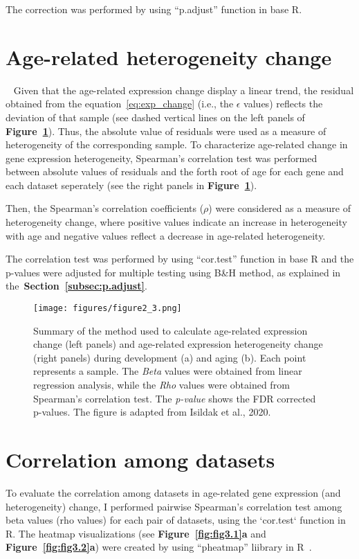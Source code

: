 The correction was performed by using ``p.adjust'' function in base R.

\section{Age-related heterogeneity change}~\label{sec:het-change}
Given that the age-related expression change display a linear trend, the residual obtained from the equation~\ref{eq:exp_change} (i.e., the $\epsilon$ values)
reflects the deviation of that sample (see dashed vertical lines on the left panels of \textbf{Figure~\ref{fig:fig2.3}}).
Thus, the absolute value of residuals were used as a measure of heterogeneity of the corresponding sample. 
To characterize age-related change in gene expression heterogeneity,
Spearman's correlation test was performed between absolute values of residuals and the forth root of age for each gene and each dataset seperately (see the right panels in \textbf{Figure~\ref{fig:fig2.3}}).

Then, the Spearman's correlation coefficients ($\rho$) were considered as a measure of heterogeneity change, 
where positive values indicate an increase in heterogeneity with age and negative values reflect a decrease in age-related heterogeneity. 

The correlation test was performed by using ``cor.test'' function in base R and the p-values were adjusted for multiple testing using B{\&}H method, 
as explained in the~\textbf{Section~\ref{subsec:p.adjust}}.

\begin{figure}[h]
\centering
\texttt{[image: figures/figure2\_3.png]}
\caption{Summary of the method used to calculate age-related expression change (left panels) 
and age-related expression heterogeneity change (right panels) during development (a) and aging (b). 
Each point represents a sample.
The \textit{Beta} values were obtained from linear regression analysis, while the \textit{Rho} values were obtained from Spearman's correlation test. 
The \textit{p-value} shows the FDR corrected p-values. 
The figure is adapted from Isildak et al., 2020.}\label{fig:fig2.3}
\end{figure}

\section{Correlation among datasets}
To evaluate the correlation among datasets in age-related gene expression (and heterogeneity) change, 
I performed pairwise Spearman's correlation test among beta values (rho values) for each pair of datasets, using the `cor.test` function in R.
The heatmap visualizations (see \textbf{Figure~\ref{fig:fig3.1}a} and \textbf{Figure~\ref{fig:fig3.2}a}) were created by using ``pheatmap'' liibrary in R~\cite{Kolde2019}.

